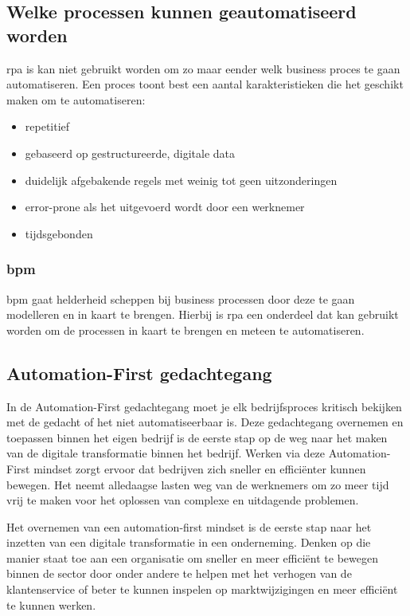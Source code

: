\subsection{Welke processen kunnen geautomatiseerd worden}
\acrshort{rpa} is kan niet gebruikt worden om zo maar eender welk business proces te gaan automatiseren. Een proces toont best een aantal karakteristieken die het geschikt maken om te automatiseren:
\begin{itemize}
	\item repetitief
	\item gebaseerd op gestructureerde, digitale data
	\item duidelijk afgebakende regels met weinig tot geen uitzonderingen
	\item error-prone als het uitgevoerd wordt door een werknemer
	\item tijdsgebonden
\end{itemize}

\subsubsection{\acrlong{bpm}}
\acrfull{bpm} gaat helderheid scheppen bij business processen door deze te gaan modelleren en in kaart te brengen. Hierbij is \acrshort{rpa} een onderdeel dat kan gebruikt worden om de processen in kaart te brengen en meteen te automatiseren.
 

\subsection{Automation-First gedachtegang}
In de Automation-First gedachtegang moet je elk bedrijfsproces kritisch bekijken met de gedacht of het niet automatiseerbaar is. Deze gedachtegang overnemen en toepassen binnen het eigen bedrijf is de eerste stap op de weg naar het maken van de digitale transformatie binnen het bedrijf. Werken via deze Automation-First mindset zorgt ervoor dat bedrijven zich sneller en efficiënter kunnen bewegen. Het neemt alledaagse lasten weg van de werknemers om zo meer tijd vrij te maken voor het oplossen van complexe en uitdagende problemen.

Het overnemen van een automation-first mindset is de eerste stap naar het inzetten van een digitale transformatie in een onderneming. Denken op die manier staat toe aan een organisatie om sneller en meer efficiënt te bewegen binnen de sector door onder andere te helpen met het verhogen van de klantenservice of beter te kunnen inspelen op marktwijzigingen en meer efficiënt te kunnen werken.

